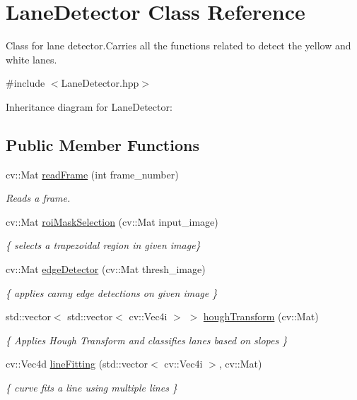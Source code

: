 \hypertarget{classLaneDetector}{}\section{Lane\+Detector Class Reference}
\label{classLaneDetector}


Class for lane detector.\+Carries all the functions related to detect the yellow and white lanes.  




{\ttfamily \#include $<$Lane\+Detector.\+hpp$>$}



Inheritance diagram for Lane\+Detector\+:
\subsection*{Public Member Functions}
\begin{DoxyCompactItemize}
\item 
cv\+::\+Mat \hyperlink{classLaneDetector_aa29c19c559518b81897c90e545c3aae1}{read\+Frame} (int frame\+\_\+number)
\begin{DoxyCompactList}\small\item\em Reads a frame. \end{DoxyCompactList}\item 
cv\+::\+Mat \hyperlink{classLaneDetector_a5ad301b4756ae451f49b43947771c02f}{roi\+Mask\+Selection} (cv\+::\+Mat input\+\_\+image)
\begin{DoxyCompactList}\small\item\em \{ selects a trapezoidal region in given image\} \end{DoxyCompactList}\item 
cv\+::\+Mat \hyperlink{classLaneDetector_a2caab27786b6168a125313aa2c36434b}{edge\+Detector} (cv\+::\+Mat thresh\+\_\+image)
\begin{DoxyCompactList}\small\item\em \{ applies canny edge detections on given image \} \end{DoxyCompactList}\item 
std\+::vector$<$ std\+::vector$<$ cv\+::\+Vec4i $>$ $>$ \hyperlink{classLaneDetector_a88ab13cba16e8e817b6d913d5acd681b}{hough\+Transform} (cv\+::\+Mat)
\begin{DoxyCompactList}\small\item\em \{ Applies Hough Transform and classifies lanes based on slopes \} \end{DoxyCompactList}\item 
cv\+::\+Vec4d \hyperlink{classLaneDetector_a8cb3e5505c760fa460a01f8eacbb3f1c}{line\+Fitting} (std\+::vector$<$ cv\+::\+Vec4i $>$, cv\+::\+Mat)
\begin{DoxyCompactList}\small\item\em \{ curve fits a line using multiple lines \} \end{DoxyCompactList}\end{DoxyCompactItemize}


